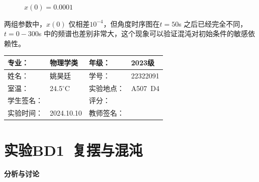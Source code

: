 \documentclass[dvipsnames, svgnames,a4paper,11pt]{article}
\begin{document}
\begin{question}
\begin{figure}[H]
		\caption{$x(0)=0.0001$}     
	\end{figure}
	两组参数中，$x(0)$ 仅相差$10^{−4}$，但角度时序图在$t = 50$s 之后已经完全不同，$t = 0 - 300$s
中的频谱也差别非常大，这个现象可以验证混沌对初始条件的敏感依赖性。
\end{question}


\clearpage
{}
\begin{table}
	\renewcommand\arraystretch{1.7}
	\centering
	\begin{tabularx}{\textwidth}{|X|X|X|X|}
	\hline
	专业：& 物理学类 &年级：& 2023级 \\
	\hline
	姓名：& 姚昊廷 &学号：&22322091  \\
	\hline
	室温：&24.5$^\circ$C&实验地点：&A507\ D4\\
	\hline
	学生签名：& & 评分： &\\
	\hline
	实验时间：& 2024.10.10& 教师签名：&\\
	\hline
	\end{tabularx}
\end{table}

\section{实验BD1\ 复摆与混沌}
\textbf{分析与讨论}
\end{document}
